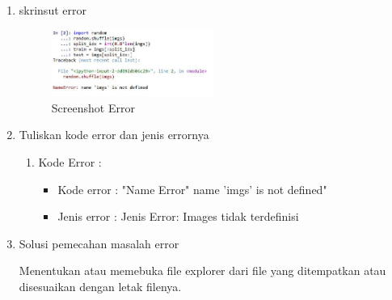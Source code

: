 \begin{enumerate}

	\item skrinsut error
		\begin{figure}[!htbp!]
		\centerline{\includegraphics[width=0.5\textwidth]{figures/chapter7/error.jpg}}
		\caption{Screenshot Error}
		\label{Error}
	\end{figure}	
		
	\item Tuliskan kode error dan jenis errornya
		\begin{enumerate}
		\item Kode Error  :
			\begin{itemize}
				\item Kode error : "Name Error" name 'imgs'  is not defined"
				\item Jenis error : Jenis Error: Images tidak terdefinisi
			\end{itemize}
		\end{enumerate}

	\item Solusi pemecahan masalah error
	\par Menentukan atau memebuka file explorer dari file yang ditempatkan atau disesuaikan dengan letak filenya.
		
		
\end{enumerate}